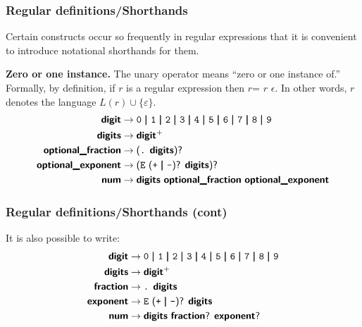 %
\begin{frame}
\frametitle{Regular definitions/Shorthands}

Certain constructs occur so frequently in regular expressions that it
is convenient to introduce notational shorthands for them.

\bigskip

\textbf{Zero or one instance.} The unary operator \opt{} means ``zero
or one instance of.'' Formally, by definition, if \(r\) is a regular
expression then \(r\)\opt = \(r\) \disj \(\epsilon\). In other
words, \lparen\(r\)\rparen\opt{} denotes the
language \(L(r) \cup \{\varepsilon\}\).
\begin{align*}
\term{digit} & \rightarrow \text{\exc{0} \disj \exc{1} \disj \exc{2}
  \disj \exc{3} \disj \exc{4} \disj \exc{5} \disj \exc{6} \disj
  \exc{7} \disj \exc{8} \disj \exc{9}}\\
\term{digits} & \rightarrow \text{\term{digit}\plus}\\
\term{optional\_fraction} & \rightarrow \text{\lparen\exc{.}
  \term{digits}\rparen\opt}\\
\term{optional\_exponent} & \rightarrow \text{\lparen\exc{E} \lparen
  \exc{+} \disj \exc{-}\rparen\opt{} \term{digits}\rparen\opt}\\
\term{num} & \rightarrow \text{\term{digits} \term{optional\_fraction}
  \term{optional\_exponent}}
\end{align*}

\end{frame}

%
\begin{frame}
\frametitle{Regular definitions/Shorthands (cont)}

It is also possible to write:
\begin{align*}
\term{digit} & \rightarrow \text{\exc{0} \disj \exc{1} \disj \exc{2}
  \disj \exc{3} \disj \exc{4} \disj \exc{5} \disj \exc{6} \disj
  \exc{7} \disj \exc{8} \disj \exc{9}}\\
\term{digits} & \rightarrow \text{\term{digit}\plus}\\
\term{fraction} & \rightarrow \text{\exc{.} \term{digits}}\\
\term{exponent} & \rightarrow \text{\exc{E} \lparen \exc{+} \disj
  \exc{-}\rparen\opt{} \term{digits}}\\
\term{num} & \rightarrow \text{\term{digits} \term{fraction}\opt{}
  \term{exponent}\opt}
\end{align*}

\end{frame}


